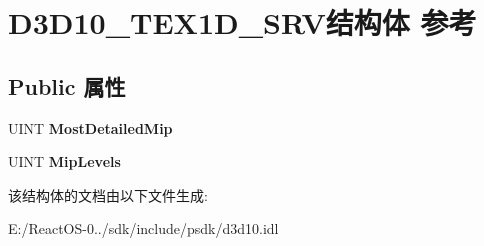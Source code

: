 \hypertarget{struct_d3_d10___t_e_x1_d___s_r_v}{}\section{D3\+D10\+\_\+\+T\+E\+X1\+D\+\_\+\+S\+R\+V结构体 参考}
\label{struct_d3_d10___t_e_x1_d___s_r_v}
\subsection*{Public 属性}
\begin{DoxyCompactItemize}
\item 
\mbox{\label{struct_d3_d10___t_e_x1_d___s_r_v_ab0c708fbcc4e760160643cbbfb3d1b24}} 
U\+I\+NT {\bfseries Most\+Detailed\+Mip}
\item 
\mbox{\label{struct_d3_d10___t_e_x1_d___s_r_v_a9d76d0c4e07063e4effa2affaabea9e1}} 
U\+I\+NT {\bfseries Mip\+Levels}
\end{DoxyCompactItemize}


该结构体的文档由以下文件生成\+:\begin{DoxyCompactItemize}
\item 
E\+:/\+React\+O\+S-\/0../sdk/include/psdk/d3d10.\+idl\end{DoxyCompactItemize}
